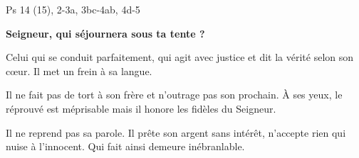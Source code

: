 Ps 14 (15), 2-3a, 3bc-4ab, 4d-5

\textbf{Seigneur, qui séjournera sous ta tente ?}

\smallskip
Celui qui se conduit parfaitement,
qui agit avec justice
et dit la vérité selon son cœur.
Il met un frein à sa langue.

\smallskip
Il ne fait pas de tort à son frère
et n’outrage pas son prochain.
À ses yeux, le réprouvé est méprisable
mais il honore les fidèles du Seigneur.

\smallskip
Il ne reprend pas sa parole.
Il prête son argent sans intérêt,
n’accepte rien qui nuise à l’innocent.
Qui fait ainsi demeure inébranlable.
